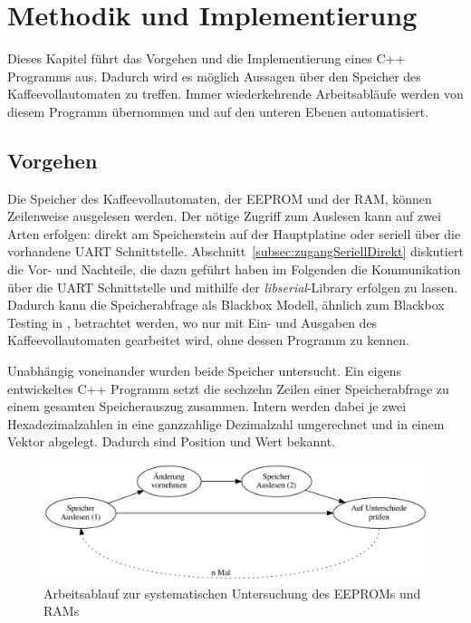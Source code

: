 \chapter{Methodik und Implementierung}\label{ch:MethodikUndImplementierung}
Dieses Kapitel führt das Vorgehen und die Implementierung eines C++ Programms aus.
Dadurch wird es möglich Aussagen über den Speicher des Kaffeevollautomaten zu treffen.
Immer wiederkehrende Arbeitsabläufe werden von diesem Programm übernommen und auf den unteren Ebenen automatisiert.

\section{Vorgehen}\label{sec:Vorgehen}
Die Speicher des Kaffeevollautomaten, der \ac{EEPROM} und der \ac{RAM}, können Zeilenweise ausgelesen werden.
Der nötige Zugriff zum Auslesen kann auf zwei Arten erfolgen: direkt am Speicherstein auf der Hauptplatine oder seriell über die vorhandene \ac{UART} Schnittstelle.
Abschnitt~\ref{subsec:zugangSeriellDirekt} diskutiert die Vor- und Nachteile, die dazu geführt haben im Folgenden die Kommunikation über die \ac{UART} Schnittstelle und mithilfe der \textit{libserial}-Library erfolgen zu lassen.
Dadurch kann die Speicherabfrage als Blackbox Modell, ähnlich zum Blackbox Testing in \cite{Solr-599853700}, betrachtet werden, wo nur mit Ein- und Ausgaben des Kaffeevollautomaten gearbeitet wird, ohne dessen Programm zu kennen.

Unabhängig voneinander wurden beide Speicher untersucht.
Ein eigens entwickeltes C++ Programm setzt die sechzehn Zeilen einer Speicherabfrage zu einem gesamten Speicherauszug zusammen.
Intern werden dabei je zwei Hexadezimalzahlen in eine ganzzahlige Dezimalzahl umgerechnet und in einem Vektor abgelegt.
Dadurch sind Position und Wert bekannt.

\begin{figure}
  \begin{center}
    \includegraphics[scale=0.6]{images/chapter_4/workflow}
    \caption{Arbeitsablauf zur systematischen Untersuchung des EEPROMs und RAMs}
    \label{fig:workflow}
  \end{center}
\end{figure}

